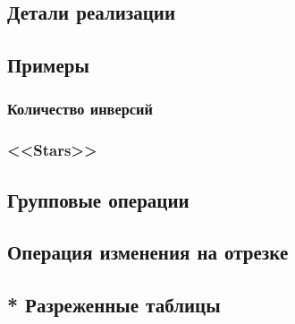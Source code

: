 \documentclass[a4paper,12pt]{article}
\begin{document}
    \subsection{Детали реализации}

    \subsection{Примеры}
      \subsubsection{Количество инверсий}
      \subsubsection{<<Stars>>}

    \subsection{Групповые операции}

    \subsection{Операция изменения на отрезке}

    \subsection{* Разреженные таблицы}
\end{document}
